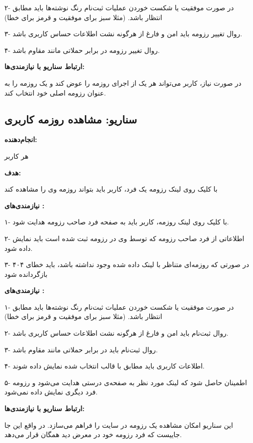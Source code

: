 \documentclass[]{article}
\begin{document}
	۲- در صورت موفقیت یا شکست خوردن عملیات ثبت‌نام رنگ نوشته‌ها باید مطابق انتظار باشد. (مثلا سبز برای موفقیت و قرمز برای خطا)
	
	۳- روال تغییر رزومه باید امن و فارغ از هرگونه نشت اطلاعات حساس کاربری باشد.
	
	۴- روال تغییر رزومه در برابر حملاتی مانند  مقاوم باشد.
	
	
	\textbf{ارتباط سناریو با نیازمندی‌ها:}
	
	در صورت نیاز، کاربر می‌تواند هر یک از اجرای روزمه را عوض کند و یک روزمه را به عنوان رزومه اصلی خود انتخاب کند.
	
	
	\subsection{\LARGE{سناریو: مشاهده روزمه کاربری}}
	
	\textbf{انجام‌دهنده:}
	
	هر کاربر
	
	\textbf{هدف:}
	
	با کلیک روی لینک رزومه یک فرد، کاربر باید بتواند روزمه وی را مشاهده کند
	
	\textbf{نیازمندی‌های :} 
	
	۱- با کلیک روی لینک روزمه، کاربر باید به صفحه فرد صاحب رزومه هدایت شود.
	
	۲- اطلاعاتی از فرد صاحب رزومه که توسط وی در رزومه ثبت شده است باید نمایش داده شود.
	
	۳- در صورتی که روزمه‌ای متناظر با لینک داده شده وجود نداشته باشد، باید خطای ۴۰۴ بازگردانده شود
	
	\textbf{نیازمندی‌های :}
	
	۱- در صورت موفقیت یا شکست خوردن عملیات ثبت‌نام رنگ نوشته‌ها باید مطابق انتظار باشد. (مثلا سبز برای موفقیت و قرمز برای خطا)
	
	۲- روال ثبت‌نام باید امن و فارغ از هرگونه نشت اطلاعات حساس کاربری باشد.
	
	۳- روال ثبت‌نام باید در برابر حملاتی مانند  مقاوم باشد.
	
	۴- اطلاعات کاربری باید مطابق با قالب انتخاب شده نمایش داده شوند.
	
	۵- اطمینان حاصل شود که لینک مورد نظر به صفحه‌ی درستی هدایت می‌شود و رزومه فرد دیگری نمایش داده نمی‌شود.
	
	
	\textbf{
		ارتباط سناریو با نیازمندی‌ها:}
	
	این سناریو امکان مشاهده یک رزومه در سایت را فراهم می‌سازد. در واقع این جا جاییست که فرد رزومه خود در معرض دید همگان قرار می‌دهد.
	
\end{document}
